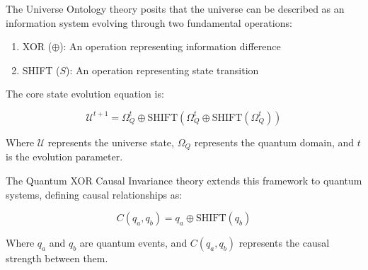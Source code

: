 The Universe Ontology theory posits that the universe can be described as an information system evolving through two fundamental operations:

\begin{enumerate}
\item XOR ($\oplus$): An operation representing information difference
\item SHIFT ($S$): An operation representing state transition
\end{enumerate}

The core state evolution equation is:

\begin{equation}
\mathcal{U}^{t+1} = \Omega_Q^{t}\oplus\text{SHIFT}(\Omega_Q^{t}\oplus\text{SHIFT}(\Omega_Q^{t}))
\end{equation}

Where $\mathcal{U}$ represents the universe state, $\Omega_Q$ represents the quantum domain, and $t$ is the evolution parameter.

The Quantum XOR Causal Invariance theory extends this framework to quantum systems, defining causal relationships as:

\begin{equation}
C(q_a, q_b) = q_a \oplus \text{SHIFT}(q_b)
\end{equation}

Where $q_a$ and $q_b$ are quantum events, and $C(q_a, q_b)$ represents the causal strength between them. 